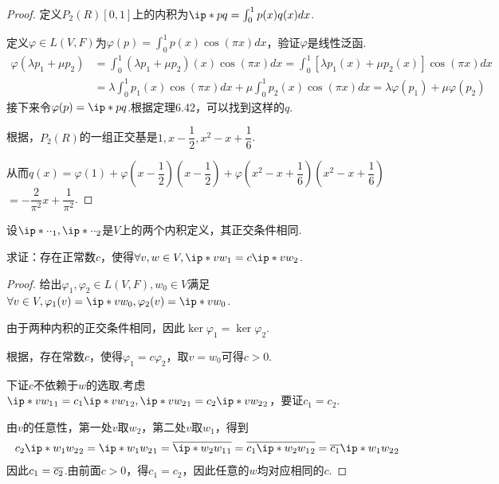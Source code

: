 \begin{proof}
    定义\(P_2(R)[0,1]\)上的内积为\(\ip*{p}{q}=\int_{0}^{1} p(x)q(x)dx\).

    定义\(\varphi \in L(V,F)\)为\(\varphi(p)=\int_{0}^{1} p(x)\cos(\pi x)dx\)，验证\(\varphi\)是线性泛函.
        \begin{align*}
            \varphi(\lambda p_1+\mu p_2)&=\int_{0}^{1} (\lambda p_1+\mu p_2)(x)\cos(\pi x)dx
            =\int_{0}^{1} [\lambda p_1(x)+\mu p_2(x)]\cos(\pi x)dx \\
            &=\lambda \int_{0}^{1}p_1(x)\cos(\pi x)dx+\mu \int_{0}^{1}p_2(x)\cos(\pi x)dx
            =\lambda \varphi(p_1)+\mu \varphi(p_2)
        \end{align*}
    接下来令\(\varphi(p)=\ip*{p}{q}\).根据定理6.42，可以找到这样的\(q\).
    
    根据，\(P_2(R)\)的一组正交基是\(1,x-\dfrac{1}{2},x^2-x+\dfrac{1}{6}\).
    
    从而\(q(x)=\varphi(1)+\varphi(x-\dfrac{1}{2})(x-\dfrac{1}{2})+\varphi(x^2-x+\dfrac{1}{6})(x^2-x+\dfrac{1}{6})\)
    \(=-\dfrac{2}{\pi^2}x+\dfrac{1}{\pi^2}\).
\end{proof}

\begin{problem}[12]\label{6.B.12}
    设\(\ip*{\cdot}{\cdot}_1,\ip*{\cdot}{\cdot}_2\)是\(V\)上的两个内积定义，其正交条件相同.

    求证：存在正常数\(c\)，使得\(\forall v,w \in V,\ip*{v}{w}_1=c\ip*{v}{w}_2\).
\end{problem}

\begin{proof}
    给出\(\varphi_1,\varphi_2 \in L(V,F),w_0 \in V\)满足\(\forall v \in V,\varphi_1(v)=\ip*{v}{w_0},\varphi_2(v)=\ip*{v}{w_0}\).

    由于两种内积的正交条件相同，因此\(\ker \varphi_1=\ker \varphi_2\).
    
    根据，存在常数\(c\)，使得\(\varphi_1=c\varphi_2\)，取\(v=w_0\)可得\(c>0\).
    
    下证\(c\)不依赖于\(w\)的选取.考虑\(\ip*{v}{w_1}_1=c_1\ip*{v}{w_1}_2,\ip*{v}{w_2}_1=c_2\ip*{v}{w_2}_2\)，要证\(c_1=c_2\).
    
由\(v\)的任意性，第一处\(v\)取\(w_2\)，第二处\(v\)取\(w_1\)，得到
    \begin{align*}
        c_2\ip*{w_1}{w_2}_2=\ip*{w_1}{w_2}_1=\ol{\ip*{w_2}{w_1}_1}
        =\ol{c_1\ip*{w_2}{w_1}_2}=\ol{c_1}\ip*{w_1}{w_2}_2
    \end{align*}
    因此\(c_1=\overline{c_2}\).由前面\(c>0\)，得\(c_1=c_2\)，因此任意的\(w\)均对应相同的\(c\).
\end{proof}

